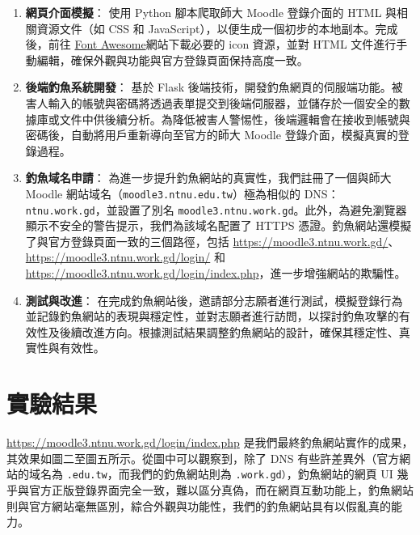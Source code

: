 \documentclass[a4paper,12pt]{article}
\begin{document}
\begin{enumerate}

    \item \textbf{網頁介面模擬}：
     使用 Python 腳本爬取師大 Moodle 登錄介面的 HTML 與相關資源文件（如 CSS 和 JavaScript），以便生成一個初步的本地副本。完成後，前往 \href{https://fontawesome.com/}{Font Awesome}網站下載必要的 icon 資源，並對 HTML 文件進行手動編輯，確保外觀與功能與官方登錄頁面保持高度一致。
    
    \item \textbf{後端釣魚系統開發}：
    基於 Flask 後端技術，開發釣魚網頁的伺服端功能。被害人輸入的帳號與密碼將透過表單提交到後端伺服器，並儲存於一個安全的數據庫或文件中供後續分析。為降低被害人警惕性，後端邏輯會在接收到帳號與密碼後，自動將用戶重新導向至官方的師大 Moodle 登錄介面，模擬真實的登錄過程。
    
    \item \textbf{釣魚域名申請}：
    為進一步提升釣魚網站的真實性，我們註冊了一個與師大 Moodle 網站域名（\texttt{moodle3.ntnu.edu.tw}）極為相似的 DNS：\texttt{ntnu.work.gd}，並設置了別名 \texttt{moodle3.ntnu.work.gd}。此外，為避免瀏覽器顯示不安全的警告提示，我們為該域名配置了 HTTPS 憑證。釣魚網站還模擬了與官方登錄頁面一致的三個路徑，包括 \url{https://moodle3.ntnu.work.gd/}、\url{https://moodle3.ntnu.work.gd/login/} 和 \url{https://moodle3.ntnu.work.gd/login/index.php}，進一步增強網站的欺騙性。
    
    \item \textbf{測試與改進}：
    在完成釣魚網站後，邀請部分志願者進行測試，模擬登錄行為並記錄釣魚網站的表現與穩定性，並對志願者進行訪問，以探討釣魚攻擊的有效性及後續改進方向。根據測試結果調整釣魚網站的設計，確保其穩定性、真實性與有效性。
    
\end{enumerate}


\section{實驗結果}
\url{https://moodle3.ntnu.work.gd/login/index.php} 是我們最終釣魚網站實作的成果，其效果如圖二至圖五所示。從圖中可以觀察到，除了 DNS 有些許差異外（官方網站的域名為 \texttt{.edu.tw}，而我們的釣魚網站則為 \texttt{.work.gd）}，釣魚網站的網頁 UI 幾乎與官方正版登錄界面完全一致，難以區分真偽，而在網頁互動功能上，釣魚網站則與官方網站毫無區別，綜合外觀與功能性，我們的釣魚網站具有以假亂真的能力。
\end{document}
